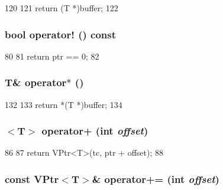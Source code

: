 \begin{DoxyCode}
120     {
121         return (T *)buffer;
122     }
\end{DoxyCode}
\hypertarget{classVPtr_ac8b1d32dbd52d431450c70b151cfa205}{
\subsubsection[{operator!}]{\setlength{\rightskip}{0pt plus 5cm}bool operator! () const}}
\label{classVPtr_ac8b1d32dbd52d431450c70b151cfa205}



\begin{DoxyCode}
80     {
81         return ptr == 0;
82     }
\end{DoxyCode}
\hypertarget{classVPtr_af7f8c6b921dca2b94f6e7ee14e762770}{
\subsubsection[{operator$\ast$}]{\setlength{\rightskip}{0pt plus 5cm}T\& operator$\ast$ ()}}
\label{classVPtr_af7f8c6b921dca2b94f6e7ee14e762770}



\begin{DoxyCode}
132     {
133         return *(T *)buffer;
134     }
\end{DoxyCode}
\hypertarget{classVPtr_aa79204a51e8317fe052ddb1f99adfd90}{
\subsubsection[{operator+}]{$<$T$>$ operator+ (int {\em offset})}}
\label{classVPtr_aa79204a51e8317fe052ddb1f99adfd90}



\begin{DoxyCode}
86     {
87         return VPtr<T>(tc, ptr + offset);
88     }
\end{DoxyCode}
\hypertarget{classVPtr_aebd3c885be33c9d591dc07ba526d12bf}{
\subsubsection[{operator+=}]{\setlength{\rightskip}{0pt plus 5cm}const {\bf VPtr}$<$T$>$\& operator+= (int {\em offset})}}
\label{classVPtr_aebd3c885be33c9d591dc07ba526d12bf}



